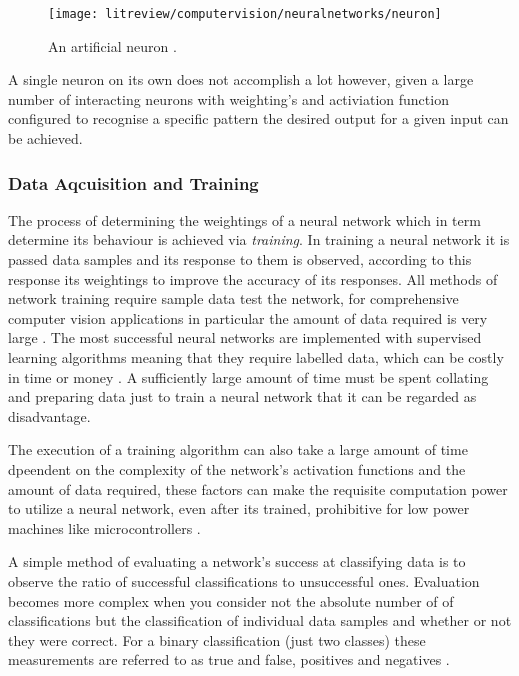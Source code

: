 \begin{figure}[h]
    \centering
    \texttt{[image: litreview/computervision/neuralnetworks/neuron]}
    \caption{An artificial neuron \cite{ann_handbook}.}
    \label{fig:neuron}
\end{figure}

A single neuron on its own does not accomplish a lot however, given a large number of interacting neurons with weighting's and activiation function configured to recognise a specific pattern the desired output for a given input can be achieved.

\subsubsection{Data Aqcuisition and Training}

The process of determining the weightings of a neural network which in term determine its behaviour is achieved via \emph{training}. In training a neural network it is passed data samples and its response to them is observed, according to this response its weightings to improve the accuracy of its responses. All methods of network training require sample data test the network, for comprehensive computer vision applications in particular the amount of data required is very large \cite{large_data_neural_network}. The most successful neural networks are implemented with supervised learning algorithms meaning that they require labelled data, which can be costly in time or money \cite{patterns_machine_learning} \cite{supervised_neural_networks}. A sufficiently large amount of time must be spent collating and preparing data just to train a neural network \cite{data_labelling} that it can be regarded as disadvantage.

The execution of a training algorithm can also take a large amount of time dpeendent on the complexity of the network's activation functions and the amount of data required, these factors can make the requisite computation power to utilize a neural network, even after its trained, prohibitive for low power machines like microcontrollers \cite{computations_neural_network}. 

A simple method of evaluating a network's success at classifying data is to observe the ratio of successful classifications to unsuccessful ones. Evaluation becomes more complex when you consider not the absolute number of of classifications but the classification of individual data samples and whether or not they were correct. For a binary classification (just two classes) these measurements are referred to as true and false, positives and negatives \cite{neural_networks}. 

